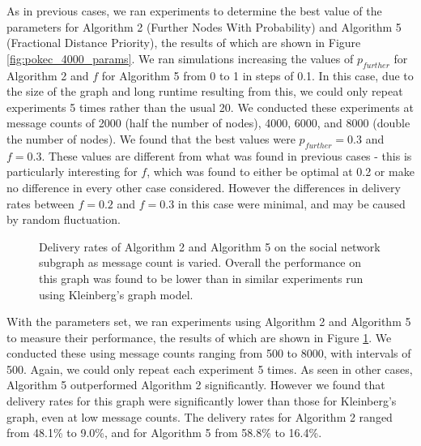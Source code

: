 \documentclass[bsc,frontabs,twoside,singlespacing,parskip,deptreport]{infthesis}     %
\begin{document}
As in previous cases, we ran experiments to determine the best value of the parameters for Algorithm 2 (Further Nodes With Probability) and Algorithm 5 (Fractional Distance Priority), the results of which are shown in Figure \ref{fig:pokec_4000_params}. We ran simulations increasing the values of $p_{further}$ for Algorithm 2 and $f$ for Algorithm 5 from 0 to 1 in steps of 0.1. In this case, due to the size of the graph and long runtime resulting from this, we could only repeat experiments 5 times rather than the usual 20. We conducted these experiments at message counts of 2000 (half the number of nodes), 4000, 6000, and 8000 (double the number of nodes). We found that the best values were $p_{further}=0.3$ and $f=0.3$. These values are different from what was found in previous cases - this is particularly interesting for $f$, which was found to either be optimal at 0.2 or make no difference in every other case considered. However the differences in delivery rates between $f=0.2$ and $f=0.3$ in this case were minimal, and may be caused by random fluctuation.

\begin{figure}
\centering
{}
\caption{Delivery rates of Algorithm 2 and Algorithm 5 on the social network subgraph as message count is varied. Overall the performance on this graph was found to be lower than in similar experiments run using Kleinberg's graph model.}
\label{fig:pokec_4000_results}
\end{figure}

With the parameters set, we ran experiments using Algorithm 2 and Algorithm 5 to measure their performance, the results of which are shown in Figure \ref{fig:pokec_4000_results}. We conducted these using message counts ranging from 500 to 8000, with intervals of 500. Again, we could only repeat each experiment 5 times. As seen in other cases, Algorithm 5 outperformed Algorithm 2 significantly. However we found that delivery rates for this graph were significantly lower than those for Kleinberg's graph, even at low message counts. The delivery rates for Algorithm 2 ranged from 48.1\% to 9.0\%, and for Algorithm 5 from 58.8\% to 16.4\%.
\end{document}
